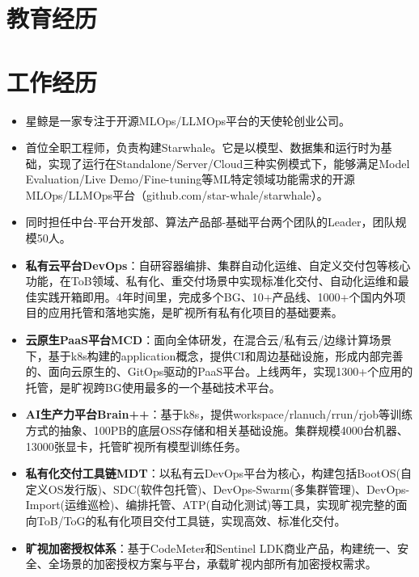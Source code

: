 \documentclass{resume}
\begin{document}



\section{教育经历}

\section{工作经历}
\begin{itemize}
    \item 星鲸是一家专注于开源MLOps/LLMOps平台的天使轮创业公司。
    \item 首位全职工程师，负责构建Starwhale。它是以模型、数据集和运行时为基础，实现了运行在Standalone/Server/Cloud三种实例模式下，能够满足Model Evaluation/Live Demo/Fine-tuning等ML特定领域功能需求的开源MLOps/LLMOps平台（github.com/star-whale/starwhale）。
\end{itemize}
\begin{itemize}
	\item 同时担任中台-平台开发部、算法产品部-基础平台两个团队的Leader，团队规模50人。
\end{itemize}
\begin{itemize}
  \item \textbf{私有云平台DevOps}：自研容器编排、集群自动化运维、自定义交付包等核心功能，在ToB领域、私有化、重交付场景中实现标准化交付、自动化运维和最佳实践开箱即用。4年时间里，完成多个BG、10+产品线、1000+个国内外项目的应用托管和落地实施，是旷视所有私有化项目的基础要素。
  \item \textbf{云原生PaaS平台MCD}：面向全体研发，在混合云/私有云/边缘计算场景下，基于k8s构建的application概念，提供CI和周边基础设施，形成内部完善的、面向云原生的、GitOps驱动的PaaS平台。上线两年，实现1300+个应用的托管，是旷视跨BG使用最多的一个基础技术平台。
  \item \textbf{AI生产力平台Brain++}：基于k8s，提供workspace/rlanuch/rrun/rjob等训练方式的抽象、100PB的底层OSS存储和相关基础设施。集群规模4000台机器、13000张显卡，托管旷视所有模型训练任务。
  \item \textbf{私有化交付工具链MDT}：以私有云DevOps平台为核心，构建包括BootOS(自定义OS发行版)、SDC(软件包托管)、DevOps-Swarm(多集群管理)、DevOps-Import(运维巡检)、编排托管、ATP(自动化测试)等工具，实现旷视完整的面向ToB/ToG的私有化项目交付工具链，实现高效、标准化交付。
  \item \textbf{旷视加密授权体系}：基于CodeMeter和Sentinel LDK商业产品，构建统一、安全、全场景的加密授权方案与平台，承载旷视内部所有加密授权需求。
\end{itemize}
\end{document}
